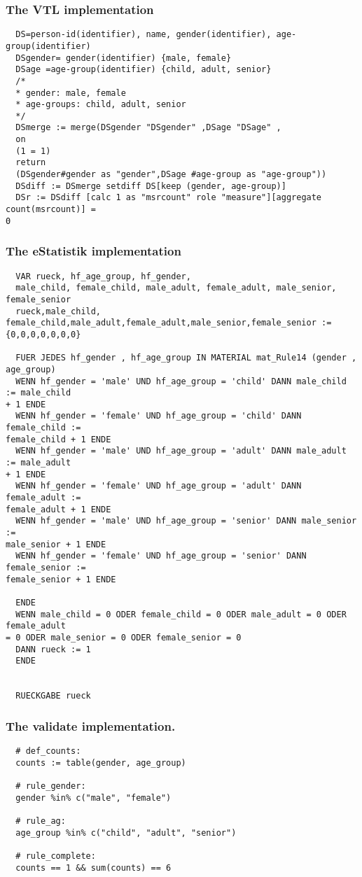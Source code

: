 \subsubsection*{The VTL implementation}
\begin{verbatim}
  DS=person-id(identifier), name, gender(identifier), age-group(identifier)
  DSgender= gender(identifier) {male, female}
  DSage =age-group(identifier) {child, adult, senior}
  /*
  * gender: male, female
  * age-groups: child, adult, senior
  */
  DSmerge := merge(DSgender "DSgender" ,DSage "DSage" ,
  on
  (1 = 1)
  return
  (DSgender#gender as "gender",DSage #age-group as "age-group"))
  DSdiff := DSmerge setdiff DS[keep (gender, age-group)]
  DSr := DSdiff [calc 1 as "msrcount" role "measure"][aggregate count(msrcount)] =
0
\end{verbatim}
\subsubsection*{The eStatistik implementation}
\begin{verbatim}
  VAR rueck, hf_age_group, hf_gender,
  male_child, female_child, male_adult, female_adult, male_senior, female_senior
  rueck,male_child,
female_child,male_adult,female_adult,male_senior,female_senior :=
{0,0,0,0,0,0,0}

  FUER JEDES hf_gender , hf_age_group IN MATERIAL mat_Rule14 (gender , age_group)
  WENN hf_gender = 'male' UND hf_age_group = 'child' DANN male_child := male_child
+ 1 ENDE
  WENN hf_gender = 'female' UND hf_age_group = 'child' DANN female_child :=
female_child + 1 ENDE
  WENN hf_gender = 'male' UND hf_age_group = 'adult' DANN male_adult := male_adult
+ 1 ENDE
  WENN hf_gender = 'female' UND hf_age_group = 'adult' DANN female_adult :=
female_adult + 1 ENDE
  WENN hf_gender = 'male' UND hf_age_group = 'senior' DANN male_senior :=
male_senior + 1 ENDE
  WENN hf_gender = 'female' UND hf_age_group = 'senior' DANN female_senior :=
female_senior + 1 ENDE

  ENDE
  WENN male_child = 0 ODER female_child = 0 ODER male_adult = 0 ODER female_adult
= 0 ODER male_senior = 0 ODER female_senior = 0
  DANN rueck := 1
  ENDE


  RUECKGABE rueck
\end{verbatim}
\subsubsection*{The validate implementation.}
\begin{verbatim}
  # def_counts:
  counts := table(gender, age_group)

  # rule_gender:
  gender %in% c("male", "female")

  # rule_ag:
  age_group %in% c("child", "adult", "senior")

  # rule_complete:
  counts == 1 && sum(counts) == 6
\end{verbatim}


